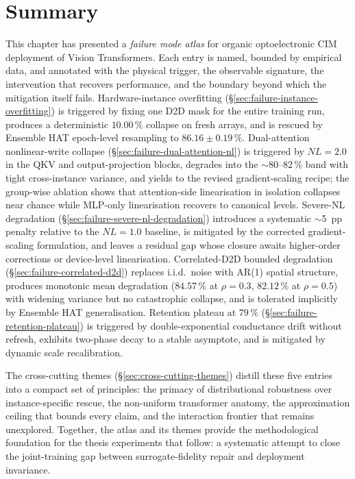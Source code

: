 \section{Summary}

This chapter has presented a \emph{failure mode atlas} for organic optoelectronic CIM deployment of Vision Transformers.  Each entry is named, bounded by empirical data, and annotated with the physical trigger, the observable signature, the intervention that recovers performance, and the boundary beyond which the mitigation itself fails.  Hardware-instance overfitting (\S\ref{sec:failure-instance-overfitting}) is triggered by fixing one D2D mask for the entire training run, produces a deterministic $10.00\,\%$ collapse on fresh arrays, and is rescued by Ensemble HAT epoch-level resampling to $86.16\pm0.19\,\%$.  Dual-attention nonlinear-write collapse (\S\ref{sec:failure-dual-attention-nl}) is triggered by $NL=2.0$ in the QKV and output-projection blocks, degrades into the $\sim$80--82\,\% band with tight cross-instance variance, and yields to the revised gradient-scaling recipe; the group-wise ablation shows that attention-side linearisation in isolation collapses near chance while MLP-only linearisation recovers to canonical levels.  Severe-NL degradation (\S\ref{sec:failure-severe-nl-degradation}) introduces a systematic $\sim$5~pp penalty relative to the $NL=1.0$ baseline, is mitigated by the corrected gradient-scaling formulation, and leaves a residual gap whose closure awaits higher-order corrections or device-level linearisation.  Correlated-D2D bounded degradation (\S\ref{sec:failure-correlated-d2d}) replaces i.i.d.~noise with AR(1) spatial structure, produces monotonic mean degradation ($84.57\,\%$ at $\rho=0.3$, $82.12\,\%$ at $\rho=0.5$) with widening variance but no catastrophic collapse, and is tolerated implicitly by Ensemble HAT generalisation.  Retention plateau at $79\,\%$ (\S\ref{sec:failure-retention-plateau}) is triggered by double-exponential conductance drift without refresh, exhibits two-phase decay to a stable asymptote, and is mitigated by dynamic scale recalibration.

The cross-cutting themes (\S\ref{sec:cross-cutting-themes}) distill these five entries into a compact set of principles: the primacy of distributional robustness over instance-specific rescue, the non-uniform transformer anatomy, the approximation ceiling that bounds every claim, and the interaction frontier that remains unexplored.  Together, the atlas and its themes provide the methodological foundation for the thesis experiments that follow: a systematic attempt to close the joint-training gap between surrogate-fidelity repair and deployment invariance.
